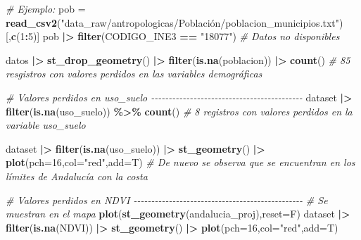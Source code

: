 \documentclass[12pt,a4paper,]{book}
\newenvironment{Shaded}{\begin{snugshade}}{\end{snugshade}}
\newcommand{\AttributeTok}[1]{\textcolor[rgb]{0.13,0.29,0.53}{#1}}
\newcommand{\CommentTok}[1]{\textcolor[rgb]{0.56,0.35,0.01}{\textit{#1}}}
\newcommand{\DecValTok}[1]{\textcolor[rgb]{0.00,0.00,0.81}{#1}}
\newcommand{\FunctionTok}[1]{\textcolor[rgb]{0.13,0.29,0.53}{\textbf{#1}}}
\newcommand{\NormalTok}[1]{#1}
\newcommand{\OtherTok}[1]{\textcolor[rgb]{0.56,0.35,0.01}{#1}}
\newcommand{\SpecialCharTok}[1]{\textcolor[rgb]{0.81,0.36,0.00}{\textbf{#1}}}
\newcommand{\StringTok}[1]{\textcolor[rgb]{0.31,0.60,0.02}{#1}}
\numberwithin{dummy}{section}
\theoremstyle{ocrenumbox}
\theoremstyle{blacknumex}
\theoremstyle{blacknumbox}
\theoremstyle{ocrenum}
\theoremstyle{ocrenum}
\begin{document}
\begin{Shaded}
\begin{Highlighting}[]
\CommentTok{\# Ejemplo:}
\NormalTok{pob }\OtherTok{=} \FunctionTok{read\_csv2}\NormalTok{(}\StringTok{"data\_raw/antropologicas/Población/poblacion\_municipios.txt"}\NormalTok{)[,}\FunctionTok{c}\NormalTok{(}\DecValTok{1}\SpecialCharTok{:}\DecValTok{5}\NormalTok{)] }
\NormalTok{pob }\SpecialCharTok{|\textgreater{}} \FunctionTok{filter}\NormalTok{(CODIGO\_INE3 }\SpecialCharTok{==} \StringTok{"18077"}\NormalTok{) }\CommentTok{\# Datos no disponibles}

\NormalTok{datos }\SpecialCharTok{|\textgreater{}} 
  \FunctionTok{st\_drop\_geometry}\NormalTok{() }\SpecialCharTok{|\textgreater{}} 
  \FunctionTok{filter}\NormalTok{(}\FunctionTok{is.na}\NormalTok{(poblacion)) }\SpecialCharTok{|\textgreater{}} 
  \FunctionTok{count}\NormalTok{() }\CommentTok{\# 85 resgistros con valores perdidos en las variables demográficas}

\CommentTok{\# Valores perdidos en uso\_suelo {-}{-}{-}{-}{-}{-}{-}{-}{-}{-}{-}{-}{-}{-}{-}{-}{-}{-}{-}{-}{-}{-}{-}{-}{-}{-}{-}{-}{-}{-}{-}{-}{-}{-}{-}{-}{-}{-}{-}{-}{-}{-}{-}}
\NormalTok{dataset }\SpecialCharTok{|\textgreater{}} \FunctionTok{filter}\NormalTok{(}\FunctionTok{is.na}\NormalTok{(uso\_suelo)) }\SpecialCharTok{\%\textgreater{}\%} \FunctionTok{count}\NormalTok{() }\CommentTok{\# 8 registros con valores perdidos en la variable uso\_suelo}

\NormalTok{dataset }\SpecialCharTok{|\textgreater{}} \FunctionTok{filter}\NormalTok{(}\FunctionTok{is.na}\NormalTok{(uso\_suelo)) }\SpecialCharTok{|\textgreater{}} \FunctionTok{st\_geometry}\NormalTok{() }\SpecialCharTok{|\textgreater{}} \FunctionTok{plot}\NormalTok{(}\AttributeTok{pch=}\DecValTok{16}\NormalTok{,}\AttributeTok{col=}\StringTok{"red"}\NormalTok{,}\AttributeTok{add=}\NormalTok{T)}
\CommentTok{\# De nuevo se observa que se encuentran en los límites de Andalucía con la costa}

\CommentTok{\# Valores perdidos en NDVI {-}{-}{-}{-}{-}{-}{-}{-}{-}{-}{-}{-}{-}{-}{-}{-}{-}{-}{-}{-}{-}{-}{-}{-}{-}{-}{-}{-}{-}{-}{-}{-}{-}{-}{-}{-}{-}{-}{-}{-}{-}{-}{-}{-}{-}{-}{-}{-}}
\CommentTok{\# Se muestran en el mapa}
\FunctionTok{plot}\NormalTok{(}\FunctionTok{st\_geometry}\NormalTok{(andalucia\_proj),}\AttributeTok{reset=}\NormalTok{F)}
\NormalTok{dataset }\SpecialCharTok{|\textgreater{}} \FunctionTok{filter}\NormalTok{(}\FunctionTok{is.na}\NormalTok{(NDVI)) }\SpecialCharTok{|\textgreater{}} \FunctionTok{st\_geometry}\NormalTok{() }\SpecialCharTok{|\textgreater{}} \FunctionTok{plot}\NormalTok{(}\AttributeTok{pch=}\DecValTok{16}\NormalTok{,}\AttributeTok{col=}\StringTok{"red"}\NormalTok{,}\AttributeTok{add=}\NormalTok{T) }



\end{Highlighting}
\end{Shaded}
\end{document}

